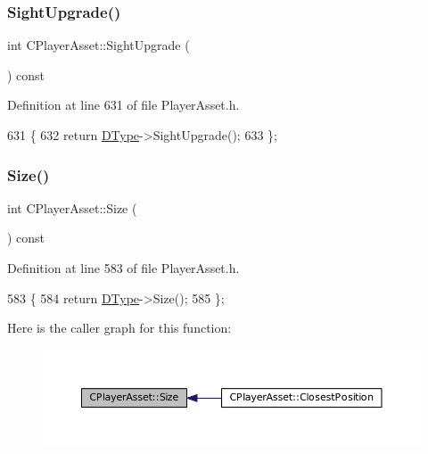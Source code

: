 \subsubsection{\texorpdfstring{Sight\+Upgrade()}{SightUpgrade()}}
{\footnotesize\ttfamily int C\+Player\+Asset\+::\+Sight\+Upgrade (\begin{DoxyParamCaption}{ }\end{DoxyParamCaption}) const\hspace{0.3cm}{\ttfamily [inline]}}



Definition at line 631 of file Player\+Asset.\+h.


\begin{DoxyCode}
631                                 \{
632             \textcolor{keywordflow}{return} \hyperlink{classCPlayerAsset_a5d61f73471e1e6f0a6ab15f2ffa7b359}{DType}->SightUpgrade();
633         \};
\end{DoxyCode}
\hypertarget{classCPlayerAsset_a85a9e2ce62f557e93219676117159fec}{}\label{classCPlayerAsset_a85a9e2ce62f557e93219676117159fec} 
\subsubsection{\texorpdfstring{Size()}{Size()}}
{\footnotesize\ttfamily int C\+Player\+Asset\+::\+Size (\begin{DoxyParamCaption}{ }\end{DoxyParamCaption}) const\hspace{0.3cm}{\ttfamily [inline]}}



Definition at line 583 of file Player\+Asset.\+h.


\begin{DoxyCode}
583                         \{
584             \textcolor{keywordflow}{return} \hyperlink{classCPlayerAsset_a5d61f73471e1e6f0a6ab15f2ffa7b359}{DType}->Size(); 
585         \};
\end{DoxyCode}
Here is the caller graph for this function\+:
\nopagebreak
\begin{figure}[H]
\begin{center}
\leavevmode
\includegraphics[width=350pt]{classCPlayerAsset_a85a9e2ce62f557e93219676117159fec_icgraph}
\end{center}
\end{figure}
\hypertarget{classCPlayerAsset_af1c093600f1567e3abf1cefc0f5350d5}{}\label{classCPlayerAsset_af1c093600f1567e3abf1cefc0f5350d5} 
